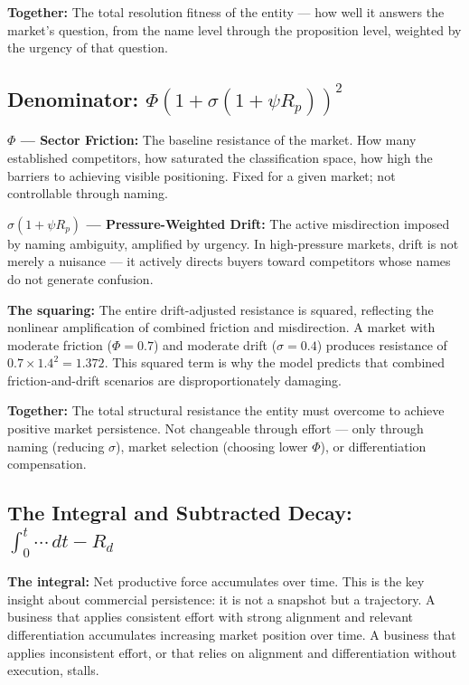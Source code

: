 \documentclass[12pt, openany]{book}
\theoremstyle{thmstyle}
\theoremstyle{defstyle}
\begin{document}
\textbf{Together:} The total resolution fitness of the entity --- how well it answers the market's question, from the name level through the proposition level, weighted by the urgency of that question.

\subsection{Denominator: $\Phi(1 + \sigma(1 + \psi R_p))^2$}

\textbf{$\Phi$ --- Sector Friction:} The baseline resistance of the market. How many established competitors, how saturated the classification space, how high the barriers to achieving visible positioning. Fixed for a given market; not controllable through naming.

\textbf{$\sigma(1 + \psi R_p)$ --- Pressure-Weighted Drift:} The active misdirection imposed by naming ambiguity, amplified by urgency. In high-pressure markets, drift is not merely a nuisance --- it actively directs buyers toward competitors whose names do not generate confusion.

\textbf{The squaring:} The entire drift-adjusted resistance is squared, reflecting the nonlinear amplification of combined friction and misdirection. A market with moderate friction ($\Phi = 0.7$) and moderate drift ($\sigma = 0.4$) produces resistance of $0.7 \times 1.4^2 = 1.372$. This squared term is why the model predicts that combined friction-and-drift scenarios are disproportionately damaging.

\textbf{Together:} The total structural resistance the entity must overcome to achieve positive market persistence. Not changeable through effort --- only through naming (reducing $\sigma$), market selection (choosing lower $\Phi$), or differentiation compensation.

\subsection{The Integral and Subtracted Decay: $\int_0^t \cdots\, dt - R_d$}

\textbf{The integral:} Net productive force accumulates over time. This is the key insight about commercial persistence: it is not a snapshot but a trajectory. A business that applies consistent effort with strong alignment and relevant differentiation accumulates increasing market position over time. A business that applies inconsistent effort, or that relies on alignment and differentiation without execution, stalls.
\end{document}
